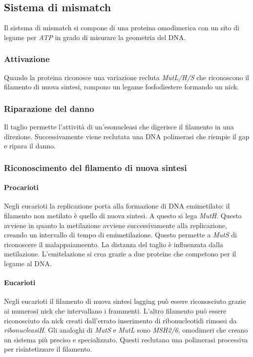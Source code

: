 	\subsection{Sistema di mismatch}
	Il sistema di mismatch si compone di una proteina omodimerica con un sito di legame per \emph{ATP} in grado di misurare la geometria del DNA.
	
		\subsubsection{Attivazione}
		Quando la proteina riconosce una variazione recluta \emph{MutL/H/S} che riconoscono il filamento di nuova sintesi, rompono un legame fosfodiestere formando un nick.
		
		\subsubsection{Riparazione del danno}
		Il taglio permette l'attivit\`a di un'esonucleasi che digerisce il filamento in una direzione.
		Successivamente viene reclutata una DNA polimerasi che riempie il gap e ripara il danno.

		\subsubsection{Riconoscimento del filamento di nuova sintesi}

			\paragraph{Procarioti}
			Negli eucarioti la replicazione porta alla formazione di DNA emimetilato: il filamento non metilato \`e quello di nuova sintesi.
			A questo si lega \emph{MutH}.
			Questo avviene in quanto la metilazione avviene successivamente alla replicazione, creando un intervallo di tempo di emimetilazione.
			Questo permette a \emph{MutS} di riconoscere il malappaiameento.
			La distanza del taglio \`e influenzata dalla metilazione.
			L'emitelazione si crea grazie a due proteine che competono per il legame al DNA.

			\paragraph{Eucarioti}
			Negli eucarioti il filamento di nuova sintesi lagging pu\`o essere riconosciuto grazie ai numerosi nick che intervallano i frammenti.
			L'altro filamento pu\`o essere riconosciuto da nick creati dall'errato inserimento di ribonucleotidi rimossi da \emph{ribonucleasiH}.
			Gli analoghi di \emph{MutS} e \emph{MutL} sono \emph{MSH2/6}, omodimeri che creano un sistema pi\`u preciso e specializzato.
			Questi reclutano una polimerasi processiva per risintetizzare il filamento.

